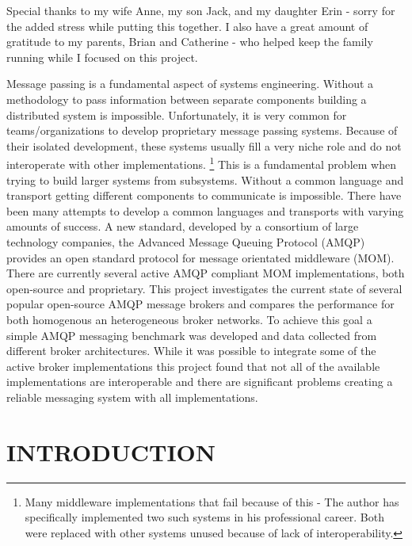 \documentclass{thesis}
\author{David Joe Wade}
\begin{document}
 
\listoftodos
\titlepage            	 %
\tableofcontents          %
\listoftables          	 %
\listoffigures         	 %

Special thanks to my wife Anne, my son Jack, and my daughter Erin - sorry for the added stress while putting this together.  I also have a great amount of gratitude to my parents, Brian and Catherine - who helped keep the family running while I focused on this project.

Message passing is a fundamental aspect of systems engineering.  Without a methodology to pass information between separate components building a distributed system is impossible.  Unfortunately, it is very common for teams/organizations to develop proprietary message passing systems.  Because of their isolated development, these systems usually fill a very niche role and do not interoperate with other implementations. \footnote{Many middleware implementations that fail because of this - The author has specifically implemented two such systems in his professional career.  Both were replaced with other systems unused because of lack of interoperability.} This is a fundamental problem when trying to build larger systems from subsystems.  Without a common language and transport getting different components to communicate is impossible.  There have been many attempts to develop a common languages and transports with varying amounts of success.  A new standard, developed by a consortium of large technology companies, the Advanced Message Queuing Protocol (AMQP) provides an open standard protocol for message orientated middleware (MOM).  There are currently several active AMQP compliant MOM implementations, both open-source and proprietary.  This project investigates the current state of several popular open-source AMQP message brokers and compares the performance for both homogenous an heterogeneous broker networks.  To achieve this goal a simple AMQP messaging benchmark was developed and data collected from different broker architectures.  While it was possible to integrate some of the active broker implementations this project found that not all of the available implementations are interoperable and there are significant problems creating a reliable messaging system with all implementations.  

\chapter{INTRODUCTION}
\end{document}
